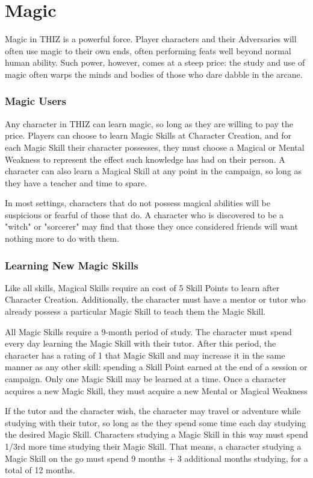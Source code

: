 \documentclass[oneside]{book}
\begin{document}
\chapter{Magic}
Magic in THIZ is a powerful force. Player characters and their Adversaries will often use magic to their own ends, often performing feats well beyond normal human ability. Such power, however, comes at a steep price: the study and use of magic often warps the minds and bodies of those who dare dabble in the arcane.

\begin{multicols}{2}
\subsection{Magic Users}
Any character in THIZ can learn magic, so long as they are willing to pay the price. Players can choose to learn Magic Skills at Character Creation, and for each Magic Skill their character possesses, they must choose a Magical or Mental Weakness to represent the effect such knowledge has had on their person. A character can also learn a Magical Skill at any point in the campaign, so long as they have a teacher and time to spare. 

In most settings, characters that do not possess magical abilities will be suspicious or fearful of those that do. A character who is discovered to be a "witch" or "sorcerer" may find that those they once considered friends will want nothing more to do with them.

\subsection{Learning New Magic Skills}
Like all skills, Magical Skills require an cost of 5 Skill Points to learn after Character Creation. Additionally, the character must have a mentor or tutor who already possess a particular Magic Skill to teach them the Magic Skill.

All Magic Skills require a 9-month period of study. The character must spend every day learning the Magic Skill with their tutor. After this period, the character has a rating of 1 that Magic Skill and may increase it in the same manner as any other skill: spending a Skill Point earned at the end of a session or campaign. Only one Magic Skill may be learned at a time. Once a character acquires a new Magic Skill, they must acquire a new Mental or Magical Weakness

If the tutor and the character wish, the character may travel or adventure while studying with their tutor, so long as the they spend some time each day studying the desired Magic Skill. Characters studying a Magic Skill in this way must spend 1/3rd more time studying their Magic Skill. That means, a character studying a Magic Skill on the go must spend 9 months + 3 additional months studying, for a total of 12 months. 


\end{multicols}
\end{document}
